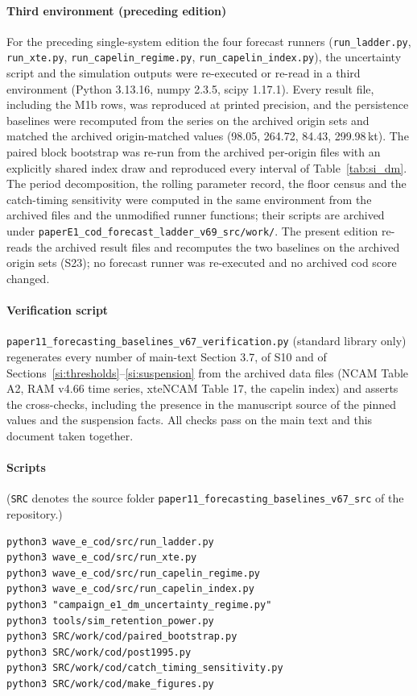 \paragraph{Third environment (preceding edition)} For the preceding single-system edition the four forecast runners (\texttt{run\_ladder.py}, \texttt{run\_xte.py}, \texttt{run\_capelin\_regime.py}, \texttt{run\_capelin\_index.py}), the uncertainty script and the simulation outputs were re-executed or re-read in a third environment (Python 3.13.16, numpy 2.3.5, scipy 1.17.1). Every result file, including the M1b rows, was reproduced at printed precision, and the persistence baselines were recomputed from the series on the archived origin sets and matched the archived origin-matched values (98.05, 264.72, 84.43, 299.98\,kt). The paired block bootstrap was re-run from the archived per-origin files with an explicitly shared index draw and reproduced every interval of Table~\ref{tab:si_dm}. The period decomposition, the rolling parameter record, the floor census and the catch-timing sensitivity were computed in the same environment from the archived files and the unmodified runner functions; their scripts are archived under \texttt{paperE1\_cod\_forecast\_ladder\_v69\_src/work/}. The present edition re-reads the archived result files and recomputes the two baselines on the archived origin sets (S23); no forecast runner was re-executed and no archived cod score changed.

\paragraph{Verification script} \texttt{paper11\_forecasting\_\allowbreak{}baselines\_v67\_\allowbreak{}verification.py} (standard library only) regenerates every number of main-text Section 3.7, of S10 and of Sections~\ref{si:thresholds}--\ref{si:suspension} from the archived data files (NCAM Table A2, RAM v4.66 time series, xteNCAM Table 17, the capelin index) and asserts the cross-checks, including the presence in the manuscript source of the pinned values and the suspension facts. All checks pass on the main text and this document taken together.

\paragraph{Scripts} (\texttt{SRC} denotes the source folder \texttt{paper11\_forecasting\_\allowbreak{}baselines\_v67\_src} of the repository.)
{\footnotesize\begin{verbatim}
python3 wave_e_cod/src/run_ladder.py
python3 wave_e_cod/src/run_xte.py
python3 wave_e_cod/src/run_capelin_regime.py
python3 wave_e_cod/src/run_capelin_index.py
python3 "campaign_e1_dm_uncertainty_regime.py"
python3 tools/sim_retention_power.py
python3 SRC/work/cod/paired_bootstrap.py
python3 SRC/work/cod/post1995.py
python3 SRC/work/cod/catch_timing_sensitivity.py
python3 SRC/work/cod/make_figures.py
\end{verbatim}}

